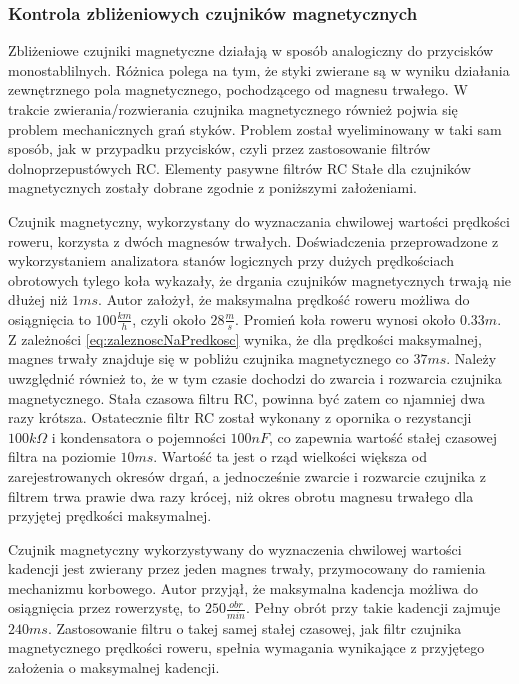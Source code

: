 \subsubsection{Kontrola zbliżeniowych czujników magnetycznych}
Zbliżeniowe czujniki magnetyczne działają w sposób analogiczny do przycisków monostablilnych. Różnica polega na tym, że styki zwierane są w wyniku działania zewnętrznego pola magnetycznego, pochodzącego od magnesu trwałego. W trakcie zwierania/rozwierania czujnika magnetycznego również pojwia się problem mechanicznych grań styków. Problem został wyeliminowany w taki sam sposób, jak w przypadku przycisków, czyli przez zastosowanie filtrów dolnoprzepustówych RC. Elementy pasywne filtrów RC Stałe dla czujników magnetycznych zostały dobrane zgodnie z poniższymi założeniami.

Czujnik magnetyczny, wykorzystany do wyznaczania chwilowej wartości prędkości roweru, korzysta z dwóch magnesów trwałych. Doświadczenia przeprowadzone z wykorzystaniem analizatora stanów logicznych przy dużych prędkościach obrotowych tylego koła wykazały, że drgania czujników magnetycznych trwają nie dłużej niż $1ms$.  Autor założył, że maksymalna prędkość roweru możliwa do osiągnięcia to $100\frac{km}{h}$, czyli około $28\frac{m}{s}$. Promień koła roweru wynosi około $0.33m$. Z zależności \ref{eq:zaleznoscNaPredkosc} wynika, że dla prędkości maksymalnej, magnes trwały znajduje się w pobliżu czujnika magnetycznego co $37ms$. Należy uwzględnić również to, że w tym czasie dochodzi do zwarcia i rozwarcia czujnika magnetycznego. Stała czasowa filtru RC, powinna być zatem co njamniej dwa razy krótsza. Ostatecznie filtr RC został wykonany z opornika o rezystancji $100k\Omega$ i kondensatora o pojemności $100nF$, co zapewnia wartość stałej czasowej filtra na poziomie $10ms$. Wartość ta jest o rząd wielkości większa od zarejestrowanych okresów drgań, a jednocześnie zwarcie i rozwarcie czujnika z filtrem trwa prawie dwa razy krócej, niż okres obrotu magnesu trwałego dla przyjętej prędkości maksymalnej.

Czujnik magnetyczny wykorzystywany do wyznaczenia chwilowej wartości kadencji jest zwierany przez jeden magnes trwały, przymocowany do ramienia mechanizmu korbowego. Autor przyjął, że maksymalna kadencja możliwa do osiągnięcia przez rowerzystę, to $250\frac{obr}{min}$. Pełny obrót przy takie kadencji zajmuje $240ms$. Zastosowanie filtru o takej samej stałej czasowej, jak filtr czujnika magnetycznego prędkości roweru, spełnia wymagania wynikające z przyjętego założenia o maksymalnej kadencji. 
